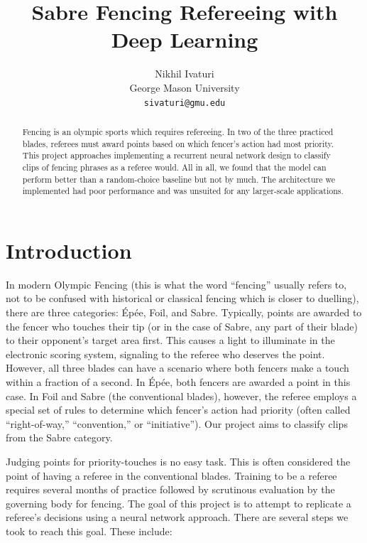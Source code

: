 \documentclass[10pt,twocolumn,letterpaper]{article}
\begin{document}
\title{Sabre Fencing Refereeing with Deep Learning}

\author{Nikhil Ivaturi\\
George Mason University\\
{\tt\small sivaturi@gmu.edu}
}

\maketitle
\thispagestyle{empty}

\begin{abstract}
    Fencing is an olympic sports which requires refereeing.
    In two of the three practiced blades, referees must award points based on which fencer's action had most priority.
    This project approaches implementing a recurrent neural network design to classify clips of fencing phrases as a referee would.
    All in all, we found that the model can perform better than a random-choice baseline but not by much.
    The architecture we implemented had poor performance and was unsuited for any larger-scale applications.
\end{abstract}

\section{Introduction}

In modern Olympic Fencing
(this is what the word “fencing” usually refers to, not to be confused with historical or classical fencing which is closer to duelling),
there are three categories: Épée, Foil, and Sabre.
Typically, points are awarded to the fencer who touches their tip
(or in the case of Sabre, any part of their blade) to their opponent's target area first.
This causes a light to illuminate in the electronic scoring system, signaling to the referee who deserves the point.
However, all three blades can have a scenario where both fencers make a touch within a fraction of a second.
In Épée, both fencers are awarded a point in this case.
In Foil and Sabre (the conventional blades), however, the referee employs a special set of rules to determine which fencer's action had priority
(often called “right-of-way,” “convention,” or “initiative”).
Our project aims to classify clips from the Sabre category.

Judging points for priority-touches is no easy task.
This is often considered the point of having a referee in the conventional blades.
Training to be a referee requires several months of practice followed by scrutinous evaluation by the governing body for fencing.
The goal of this project is to attempt to replicate a referee's decisions using a neural network approach.
There are several steps we took to reach this goal.
These include:
\end{document}
